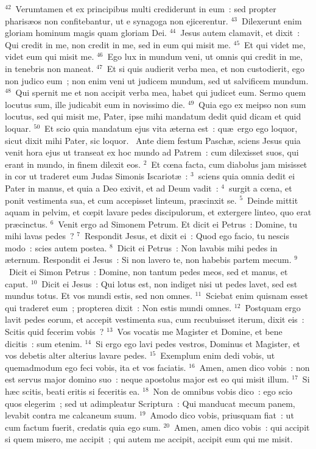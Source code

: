 ${}^{42}$~Verumtamen et ex principibus multi crediderunt in eum~: sed propter pharis\ae os non confitebantur, ut e synagoga non ejicerentur.
${}^{43}$~Dilexerunt enim gloriam hominum magis quam gloriam Dei.
${}^{44}$~Jesus autem clamavit, et dixit~: Qui credit in me, non credit in me, sed in eum qui misit me.
${}^{45}$~Et qui videt me, videt eum qui misit me.
${}^{46}$~Ego lux in mundum veni, ut omnis qui credit in me, in tenebris non maneat.
${}^{47}$~Et si quis audierit verba mea, et non custodierit, ego non judico eum~; non enim veni ut judicem mundum, sed ut salvificem mundum.
${}^{48}$~Qui spernit me et non accipit verba mea, habet qui judicet eum. Sermo quem locutus sum, ille judicabit eum in novissimo die.
${}^{49}$~Quia ego ex meipso non sum locutus, sed qui misit me, Pater, ipse mihi mandatum dedit quid dicam et quid loquar.
${}^{50}$~Et scio quia mandatum ejus vita \ae terna est~: qu\ae\ ergo ego loquor, sicut dixit mihi Pater, sic loquor.
~\lettrine[lines=10,image=true,loversize=0.05,lraise=-0.03]{A}{}nte diem festum Pasch\ae , sciens Jesus quia venit hora ejus ut transeat ex hoc mundo ad Patrem~: cum dilexisset suos, qui erant in mundo, in finem dilexit eos.
${}^{2}$~Et cœna facta, cum diabolus jam misisset in cor ut traderet eum Judas Simonis Iscariot\ae~:
${}^{3}$~sciens quia omnia dedit ei Pater in manus, et quia a Deo exivit, et ad Deum vadit~:
${}^{4}$~surgit a cœna, et ponit vestimenta sua, et cum accepisset linteum, pr\ae cinxit se.
${}^{5}$~Deinde mittit aquam in pelvim, et cœpit lavare pedes discipulorum, et extergere linteo, quo erat pr\ae cinctus.
${}^{6}$~Venit ergo ad Simonem Petrum. Et dicit ei Petrus~: Domine, tu mihi lavas pedes~?
${}^{7}$~Respondit Jesus, et dixit ei~: Quod ego facio, tu nescis modo~: scies autem postea.
${}^{8}$~Dicit ei Petrus~: Non lavabis mihi pedes in \ae ternum. Respondit ei Jesus~: Si non lavero te, non habebis partem mecum.
${}^{9}$~Dicit ei Simon Petrus~: Domine, non tantum pedes meos, sed et manus, et caput.
${}^{10}$~Dicit ei Jesus~: Qui lotus est, non indiget nisi ut pedes lavet, sed est mundus totus. Et vos mundi estis, sed non omnes.
${}^{11}$~Sciebat enim quisnam esset qui traderet eum~; propterea dixit~: Non estis mundi omnes.
${}^{12}$~Postquam ergo lavit pedes eorum, et accepit vestimenta sua, cum recubuisset iterum, dixit eis~: Scitis quid fecerim vobis~?
${}^{13}$~Vos vocatis me Magister et Domine, et bene dicitis~: sum etenim.
${}^{14}$~Si ergo ego lavi pedes vestros, Dominus et Magister, et vos debetis alter alterius lavare pedes.
${}^{15}$~Exemplum enim dedi vobis, ut quemadmodum ego feci vobis, ita et vos faciatis.
${}^{16}$~Amen, amen dico vobis~: non est servus major domino suo~: neque apostolus major est eo qui misit illum.
${}^{17}$~Si h\ae c scitis, beati eritis si feceritis ea.
${}^{18}$~Non de omnibus vobis dico~: ego scio quos elegerim~; sed ut adimpleatur Scriptura~: Qui manducat mecum panem, levabit contra me calcaneum suum.
${}^{19}$~Amodo dico vobis, priusquam fiat~: ut cum factum fuerit, credatis quia ego sum.
${}^{20}$~Amen, amen dico vobis~: qui accipit si quem misero, me accipit~; qui autem me accipit, accipit eum qui me misit.


